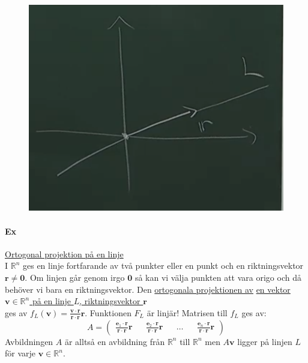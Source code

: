 \begin{figure}
    \centering
    \includegraphics[scale=0.2]{imgs/img01.png}
\end{figure}
\paragraph{Ex} \underline{Ortogonal projektion på en linje}\\
I $\mathbb{R}^{n}$ ges en linje fortfarande av två punkter eller en punkt och en riktningsvektor $\bm{r}\neq \bm{0}$.
Om linjen går genom irgo $\bm{0}$ så kan vi välja punkten att vara origo och då behöver vi bara en riktningsvektor.
Den \underline{ortogonala projektionen av}
\underline{en vektor $\bm{v}\in \mathbb{R}^{n}$ på en linje $L$, riktningsvektor $\bm{r}$}\\
ges av $f_{L}(\bm{v})=\frac{\bm{v}\cdot \bm{r}}{\bm{r}\cdot \bm{r}}\bm{r}$.
Funktionen $F_{L}$ är linjär!
Matrisen till $f_{L}$ ges av: 
\begin{equation*}
    A=\begin{pmatrix}
        \frac{\bm{e}_{1}\cdot\bm{r}}{\bm{r}\cdot\bm{r}}\bm{r} && \frac{\bm{e}_{2}\cdot\bm{r}}{\bm{r}\cdot\bm{r}}\bm{r} && \ldots && \frac{\bm{e}_{n}\cdot\bm{r}}{\bm{r}\cdot\bm{r}}\bm{r}
    \end{pmatrix}
\end{equation*}
Avbildningen $A$ är alltså en avbildning från $\mathbb{R}^{n}$ till $\mathbb{R}^{n}$ men $A\bm{v}$ ligger på linjen $L$ för varje $\bm{v}\in\mathbb{R}^{n}$.

